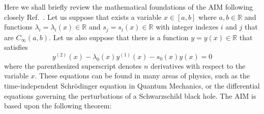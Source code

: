 
Here we shall briefly review the mathematical foundations of the AIM following closely Ref.~\cite{aim_original}. Let us suppose that exists a variable $x \in [a,b]$ where $a,b \in \mathbb{R}$ and functions $\lambda_i = \lambda_i(x) \in \mathbb{R}$ and $s_j = s_i(x) \in \mathbb{R}$ with integer indexes $i$ and $j$ that are $C_\infty(a,b)$. Let us also suppose that there is a function $y=y(x)\in\mathbb{R}$ that satisfies
%
\begin{equation}
  y^{(2)}(x) - \lambda_0(x) y^{(1)}(x) - s_0(x)y(x) = 0
  \label{eq:aim_general_ode}
\end{equation}
%
where the parenthesized superscript denotes $n$ derivatives with respect to the variable $x$. These equations can be found in many areas of physics, such as the time-independent Schr\"odinger equation in Quantum Mechanics, or the differential equations governing the perturbations of a Schwarzschild black hole. The AIM is based upon the following theorem:

